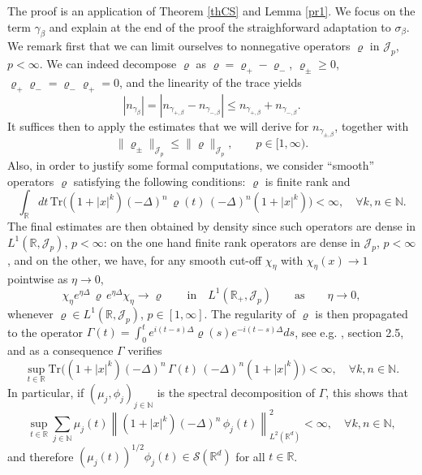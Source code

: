 \documentclass[12pt]{article}
\def \Rm {\mathbb R}
\def \Nm {\mathbb N}
\def\II{\mathbb{I}}
\newcommand{\Tr}{\textrm{Tr}}
\newcommand{\calS}{\mathcal S}
\newcommand{\calJ}{\mathcal J}
\newcommand{\be}{\begin{equation}}
\newcommand{\ee}{\end{equation}}
\begin{document}
The proof is an application of Theorem \ref{thCS} and Lemma \ref{pr1}. We focus on the term $\gamma_\beta$ and explain at the end of the proof the straighforward adaptation to $\sigma_\beta$. We remark first that we can limit ourselves to nonnegative operators $\varrho$ in $\calJ_p$, $p<\infty$. We can indeed decompose $\varrho$ as $\varrho=\varrho_+-\varrho_-$, $\varrho_{\pm} \geq 0$, $\varrho_+ \varrho_-=\varrho_- \varrho_+=0$, and  the linearity of the trace yields
$$
|n_{\gamma_\beta}|=|n_{\gamma_{+,\beta}}-n_{\gamma_{-,\beta}}| \leq n_{\gamma_{+,\beta}}+n_{\gamma_{-,\beta}}.
$$
It suffices then to apply the estimates that we will derive for  $n_{\gamma_{\pm,\beta}}$, together with
$$
\| \varrho_{\pm} \|_{\calJ_p} \leq \|\varrho\|_{\calJ_p}, \qquad p \in [1,\infty).
$$
Also, in order to justify some formal computations, we consider  ``smooth'' operators $\varrho$ satisfying the following conditions: $\varrho$ is finite rank and 
\be \label{condrho}
\int_\Rm dt\, \Tr \Big((1+|x|^k) (-\Delta)^n \,\varrho(t)\, (-\Delta)^n (1+|x|^k)\Big) <\infty, \quad \forall k,n \in \Nm.
\ee
The final estimates are then obtained by density since such operators are dense in $L^1(\Rm,\calJ_p)$, $p<\infty$: on the one hand finite rank operators are dense in $\calJ_p$, $p<\infty$, and on the other, we have, for any smooth cut-off $\chi_\eta$ with $\chi_\eta(x) \to 1$ pointwise as $\eta \to 0$,
$$
\chi_\eta  e^{\eta \Delta}\,  \varrho \, e^{\eta \Delta} \chi_\eta  \to \varrho  \qquad \textrm{in} \quad L^1(\Rm_+,\calJ_p) \qquad \textrm{as} \qquad \eta \to 0, 
$$
whenever $\varrho \in L^1(\Rm,\calJ_p)$, $p\in [1,\infty]$. The regularity of $\varrho$ is then propagated to the operator $\Gamma(t)=\int_0^t e^{i (t-s) \Delta} \varrho(s) e^{-i (t-s) \Delta} ds$, see e.g. \cite{cazenave}, section 2.5, and as a consequence $\Gamma$ verifies
$$
\sup_{t \in \Rm} \Tr \Big((1+|x|^k) (-\Delta)^n \,\Gamma(t)\, (-\Delta)^n (1+|x|^k)\Big) <\infty, \quad \forall k,n \in \Nm.
$$
In particular, if $(\mu_j,\phi_j)_{j\in \Nm}$ is the spectral decomposition of $\Gamma$, this shows that
$$
\sup_{t \in \Rm} \sum_{j \in \Nm} \mu_j(t) \left\|(1+|x|^k) (-\Delta)^n \,\phi_j(t)\right\|^2_{L^2(\Rm^d)} < \infty, \quad \forall k,n \in \Nm,
$$
and therefore $(\mu_j(t))^{1/2}\phi_j(t) \in \calS(\Rm^d)$ for all $t \in \Rm$.\\
\end{document}
